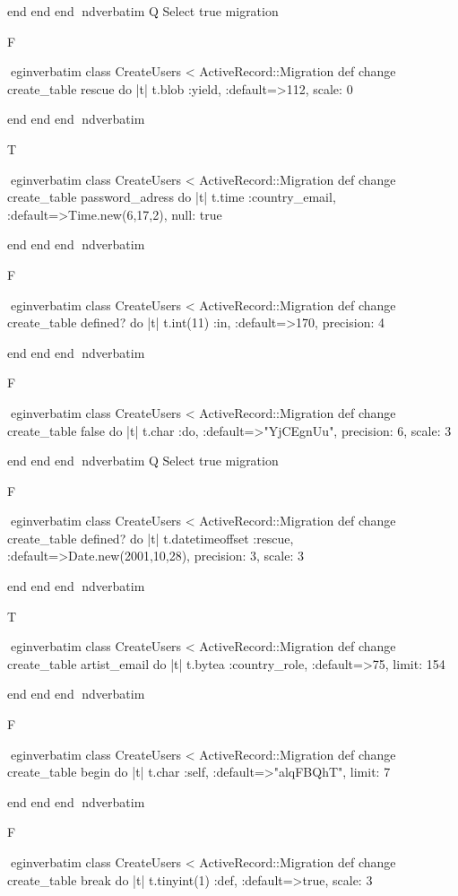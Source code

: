     end 
  end 
end
nd{verbatim}
Q
 Select true migration

F

egin{verbatim}
 class CreateUsers < ActiveRecord::Migration 
  def change 
    create_table rescue do |t| 
      t.blob :yield, :default=>112, scale: 0
    
    end 
  end 
end
nd{verbatim}

T

egin{verbatim}
 class CreateUsers < ActiveRecord::Migration 
  def change 
    create_table password_adress do |t| 
      t.time :country_email, :default=>Time.new(6,17,2), null: true
    
    end 
  end 
end
nd{verbatim}

F

egin{verbatim}
 class CreateUsers < ActiveRecord::Migration 
  def change 
    create_table defined? do |t| 
      t.int(11) :in, :default=>170, precision: 4
    
    end 
  end 
end
nd{verbatim}

F

egin{verbatim}
 class CreateUsers < ActiveRecord::Migration 
  def change 
    create_table false do |t| 
      t.char :do, :default=>"YjCEgnUu", precision: 6, scale: 3
    
    end 
  end 
end
nd{verbatim}
Q
 Select true migration

F

egin{verbatim}
 class CreateUsers < ActiveRecord::Migration 
  def change 
    create_table defined? do |t| 
      t.datetimeoffset :rescue, :default=>Date.new(2001,10,28), precision: 3, scale: 3
    
    end 
  end 
end
nd{verbatim}

T

egin{verbatim}
 class CreateUsers < ActiveRecord::Migration 
  def change 
    create_table artist_email do |t| 
      t.bytea :country_role, :default=>75, limit: 154
    
    end 
  end 
end
nd{verbatim}

F

egin{verbatim}
 class CreateUsers < ActiveRecord::Migration 
  def change 
    create_table begin do |t| 
      t.char :self, :default=>"alqFBQhT", limit: 7
    
    end 
  end 
end
nd{verbatim}

F

egin{verbatim}
 class CreateUsers < ActiveRecord::Migration 
  def change 
    create_table break do |t| 
      t.tinyint(1) :def, :default=>true, scale: 3
    
